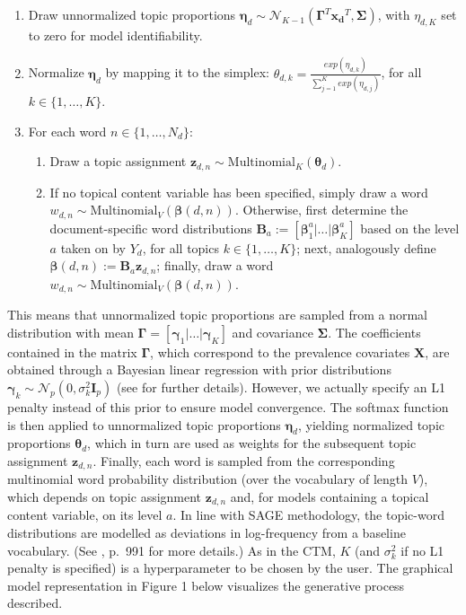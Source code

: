 \begin{enumerate}[{1)}]
\item Draw unnormalized topic proportions $\boldsymbol{\eta}_d \sim \mathcal{N}_{K-1}(\boldsymbol{\Gamma}^T\boldsymbol{x_d}^T, \boldsymbol{\Sigma})$, with $\eta_{d,K}$ set to zero for model identifiability.
\item Normalize $\boldsymbol{\eta}_d$ by mapping it to the simplex: $\theta_{d,k} = \frac{exp(\eta_{d,k})}{\sum_{j=1}^{K}exp(\eta_{d,j})}$, for all $k \in \{1,\dots,K\}$.
\item For each word $n \in \{1,\dots,N_d\}$:
	\begin{enumerate}[{a)}]  
    \item Draw a topic assignment $\boldsymbol{z}_{d,n} \sim \text{Multinomial}_K(\boldsymbol{\theta}_d)$.   
    \item If no topical content variable has been specified, simply draw a word $w_{d,n} \sim \text{Multinomial}_V(\boldsymbol{\beta}(d,n))$. Otherwise, first determine the document-specific word distributions $\boldsymbol{B}_a := [\boldsymbol{\beta}_1^{a}|\dots|\boldsymbol{\beta}_K^{a}]$ based on the level $a$ taken on by $Y_d$, for all topics $k \in \{1,\dots,K\}$; next, analogously define $\boldsymbol{\beta}(d,n):=\boldsymbol{B}_a\boldsymbol{z}_{d,n}$; finally, draw a word $w_{d,n} \sim \text{Multinomial}_V(\boldsymbol{\beta}(d,n))$.
	\end{enumerate}
\end{enumerate}

\noindent
This means that unnormalized topic proportions are sampled from a normal distribution with mean $\boldsymbol{\Gamma} = [\boldsymbol{\gamma}_1|\dots|\boldsymbol{\gamma}_K]$ and covariance $\boldsymbol{\Sigma}$. The coefficients contained in the matrix $\boldsymbol{\Gamma}$, which correspond to the prevalence covariates $\boldsymbol{X}$, are obtained through a Bayesian linear regression with prior distributions $\boldsymbol{\gamma}_k \sim \mathcal{N}_p(0, \sigma_k^2\boldsymbol{I}_p)$ (see \citealp{roberts2016model} for further details). However, we actually specify an L1 penalty instead of this prior to ensure model convergence. The softmax function is then applied to unnormalized topic proportions $\boldsymbol{\eta}_d$, yielding normalized topic proportions $\boldsymbol{\theta}_d$, which in turn are used as weights for the subsequent topic assignment $\boldsymbol{z}_{d,n}$. Finally, each word is sampled from the corresponding multinomial word probability distribution (over the vocabulary of length $V$), which depends on topic assignment $\boldsymbol{z}_{d,n}$ and, for models containing a topical content variable, on its level $a$. In line with SAGE methodology, the topic-word distributions are modelled as deviations in log-frequency from a baseline vocabulary. (See \citealp{roberts2016model}, p.\ 991 for more details.) As in the CTM, $K$ (and $\sigma_k^2$ if no L1 penalty is specified) is a hyperparameter to be chosen by the user. The graphical model representation in Figure 1 below visualizes the generative process described.


